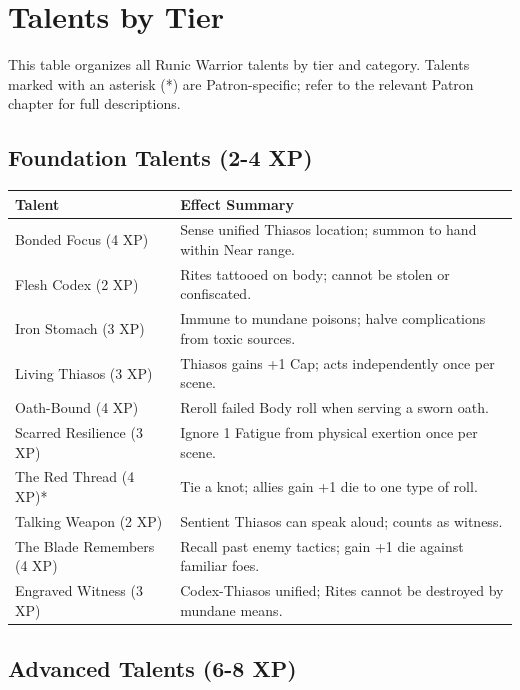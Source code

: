 \section{Talents by Tier}

This table organizes all Runic Warrior talents by tier and category. Talents marked with an asterisk (*) are Patron-specific; refer to the relevant Patron chapter for full descriptions.

\subsection{Foundation Talents (2-4 XP)}

\begin{longtable}{p{} p{}}
\hline
\textbf{Talent} & \textbf{Effect Summary} \\
\hline
Bonded Focus (4 XP) & Sense unified Thiasos location; summon to hand within Near range. \\
Flesh Codex (2 XP) & Rites tattooed on body; cannot be stolen or confiscated. \\
Iron Stomach (3 XP) & Immune to mundane poisons; halve complications from toxic sources. \\
Living Thiasos (3 XP) & Thiasos gains +1 Cap; acts independently once per scene. \\
Oath-Bound (4 XP) & Reroll failed Body roll when serving a sworn oath. \\
Scarred Resilience (3 XP) & Ignore 1 Fatigue from physical exertion once per scene. \\
The Red Thread (4 XP)* & Tie a knot; allies gain +1 die to one type of roll. \\
Talking Weapon (2 XP) & Sentient Thiasos can speak aloud; counts as witness. \\
The Blade Remembers (4 XP) & Recall past enemy tactics; gain +1 die against familiar foes. \\
Engraved Witness (3 XP) & Codex-Thiasos unified; Rites cannot be destroyed by mundane means. \\
\hline
\end{longtable}

\subsection{Advanced Talents (6-8 XP)}


